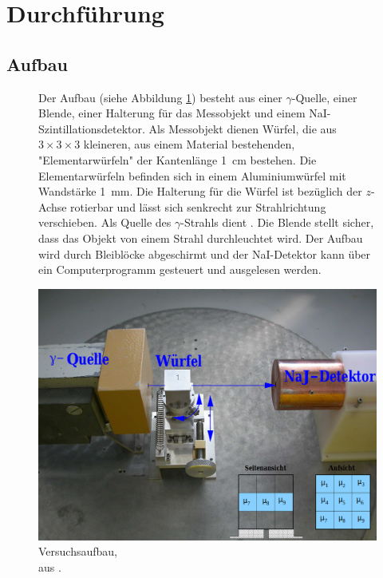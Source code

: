 \section{Durchführung}
\subsection{Aufbau}
\begin{figure}[h!]
  \begin{minipage}{0.6\textwidth}
    Der Aufbau (siehe Abbildung \ref{abb:1}) besteht aus einer $\gamma$-Quelle,
    einer Blende, einer Halterung für das Messobjekt und einem NaI-Szintillationsdetektor.
    Als Messobjekt dienen Würfel, die aus $3\times3\times3$ kleineren, aus einem Material
    bestehenden, "Elementarwürfeln" der Kantenlänge \SI{1}{\centi\metre} bestehen.
    Die Elementarwürfeln befinden sich in einem Aluminiumwürfel mit Wandstärke \SI{1}{\milli\metre}.
    Die Halterung für die Würfel ist bezüglich der $z$-Achse rotierbar und lässt sich senkrecht
    zur Strahlrichtung verschieben.
    Als Quelle des $\gamma$-Strahls dient .
    Die Blende stellt sicher, dass das Objekt von einem Strahl durchleuchtet wird.
    Der Aufbau wird durch Bleiblöcke abgeschirmt und der NaI-Detektor kann über ein
    Computerprogramm gesteuert und ausgelesen werden.
  \end{minipage}
  \hfill
  \begin{minipage}{0.35\textwidth}
    \includegraphics[width=\textwidth]{content/pics/Aufbau.png}
    \caption{Versuchsaufbau, \\aus \cite{anleitung}.}
    \label{abb:1}
  \end{minipage}
\end{figure}



